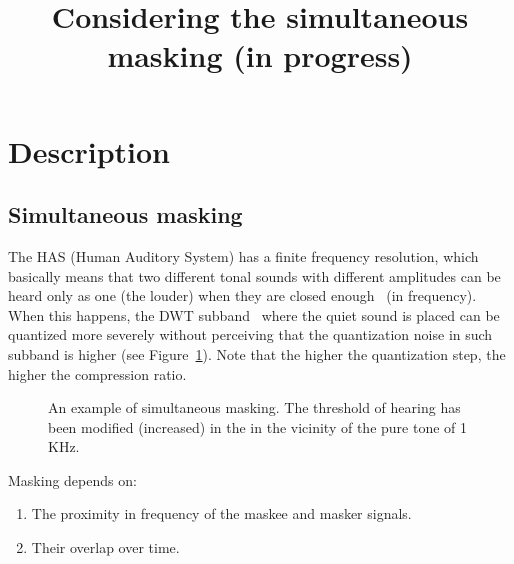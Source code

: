 

\title{Considering the simultaneous masking (in progress)}


\maketitle

\section{Description}

\subsection{Simultaneous masking}
The HAS (Human Auditory System) has a finite frequency resolution,
which basically means that two different tonal sounds with different
amplitudes can be heard only as one (the louder) when they are
closed enough~\cite{bosi2003intro} (in frequency). When this happens,
the DWT subband~\cite{vetterli1995wavelets} where the quiet sound is
placed can be quantized more severely without perceiving that the
quantization noise in such subband is higher (see
Figure~\ref{fig:SM}). Note that the higher the quantization step,
the higher the compression ratio.

\begin{figure}
  \centering
  \caption{An example of simultaneous masking. The threshold of
    hearing has been modified (increased) in the in the vicinity of
    the pure tone of 1 KHz.}
  \label{fig:SM}
\end{figure}

Masking depends on:
\begin{enumerate}
\item The proximity in frequency of the maskee and masker signals.
\item Their overlap over time.
\end{enumerate}

